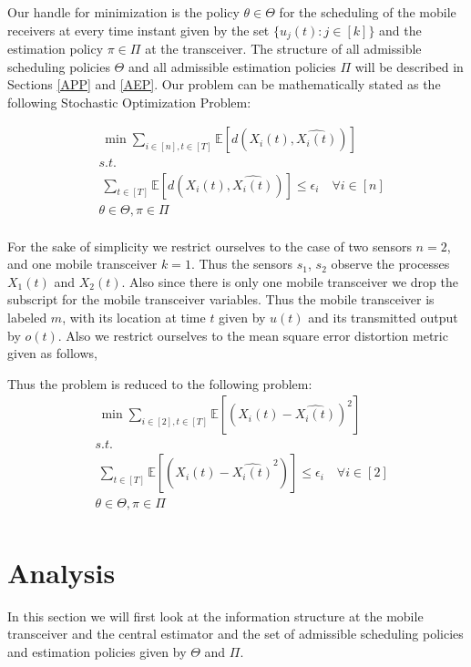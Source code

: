 \documentclass[a4paper,english,12pt]{article}
\begin{document}
 Our handle for minimization is the policy $\theta\in\Theta $ for the scheduling of the mobile receivers at every time instant given by the set $\{u_j(t): j \in [k]\}$ and the estimation policy $\pi \in \Pi$ at the transceiver. The structure of all admissible scheduling policies $\Theta$ and all admissible estimation policies $\Pi$ will be described in  Sections \ref{APP} and \ref{AEP}.  
 Our problem can be mathematically stated as the following Stochastic Optimization Problem:

\begin{align}
& \ \min \sum_{i \in [n], t \in [T]} \mathbb{E}[ d(X_i(t),\hat{X_i(t)})]\\
& s.t. \nonumber\\
 &\ \sum_{t \in [T]} \mathbb{E}[d(X_i(t),\hat{X_i(t)})] \leq \epsilon_i \quad \forall i \in [n] \nonumber\\
& \theta \in \Theta , \pi \in \Pi\nonumber\\
\nonumber
\end{align}

For the sake of simplicity we restrict ourselves to the case of two sensors $n=2$, and one mobile transceiver $k=1$. Thus the sensors $s_1$, $s_2$ observe the processes $X_1(t)$ and $X_2(t)$. Also since there is only one mobile transceiver we drop the subscript for the mobile transceiver variables. Thus the mobile transceiver is labeled $m$, with its location at time $t$ given by $u(t)$ and its transmitted output by $o(t)$. Also we restrict ourselves to the   mean square error  distortion metric given as follows,

Thus the problem is reduced to the following problem:
\begin{align}\label{Opt}
& \ \min \sum_{i \in [2], t \in [T]} \mathbb{E}[ (X_i(t)-\hat{X_i(t)})^2]\\
& s.t. \nonumber\\
 &\ \sum_{t \in [T]} \mathbb{E}[(X_i(t)-\hat{X_i(t)}^2)] \leq \epsilon_i \quad \forall i \in [2] \nonumber\\
& \theta \in \Theta , \pi \in \Pi\nonumber\\
\nonumber
\end{align}

\section{Analysis}\label{analysis}
In this section we  will first look at the information structure at the mobile transceiver and the central estimator and the set of admissible scheduling policies and estimation policies given by $\Theta$ and $\Pi$.
\end{document}
